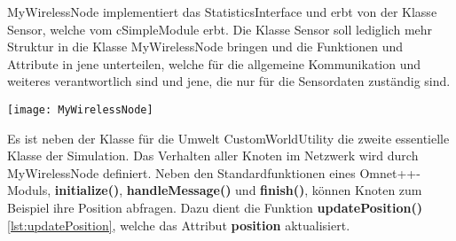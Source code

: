 MyWirelessNode implementiert das StatisticsInterface und erbt von der Klasse Sensor, welche vom cSimpleModule erbt. Die Klasse Sensor soll lediglich mehr Struktur in die Klasse MyWirelessNode bringen und die Funktionen und Attribute in jene unterteilen, welche für die allgemeine Kommunikation und weiteres verantwortlich sind und jene, die nur für die Sensordaten zuständig sind. \newline

\begin{center}
\texttt{[image: MyWirelessNode]}
\end{center}

Es ist neben der Klasse für die Umwelt CustomWorldUtility die zweite essentielle Klasse der Simulation. Das Verhalten aller Knoten im Netzwerk wird durch MyWirelessNode definiert. Neben den Standardfunktionen eines Omnet++-Moduls, \textbf{initialize()}, \textbf{handleMessage()} und \textbf{finish()}, können Knoten zum Beispiel ihre Position abfragen. \newline
Dazu dient die Funktion \textbf{updatePosition()} \ref{lst:updatePosition}, welche das Attribut \textbf{position} aktualisiert.

